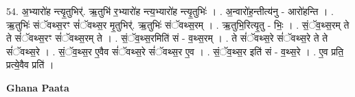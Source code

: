 \documentclass[17pt]{extarticle}
\begin{document}
54. अ॒भ्यारो॑ह न्त्यृ॒तुभिर्॑. ऋ॒तुभि॑ र॒भ्यारो॑ह न्त्य॒भ्यारो॑ह न्त्यृ॒तुभिः॑ । . अ॒न्वारो॑ह॒न्तीत्य॑नु - आरो॑हन्ति । . ऋ॒तुभिः॑ संॅवथ्स॒रꣳ सं॑ॅवथ्स॒र मृ॒तुभिर्॑. ऋ॒तुभिः॑ संॅवथ्स॒रम् । . ऋ॒तुभि॒रित्यृ॒तु - भिः॒ । . सं॒ॅव॒थ्स॒रम् ते ते सं॑ॅवथ्स॒रꣳ सं॑ॅवथ्स॒रम् ते । . सं॒ॅव॒थ्स॒रमिति॑ सं - व॒थ्स॒रम् । . ते सं॑ॅवथ्स॒रे सं॑ॅवथ्स॒रे ते ते सं॑ॅवथ्स॒रे । . सं॒ॅव॒थ्स॒र ए॒वैव सं॑ॅवथ्स॒रे सं॑ॅवथ्स॒र ए॒व । . सं॒ॅव॒थ्स॒र इति॑ सं - व॒थ्स॒रे । . ए॒व प्रति॒ प्रत्ये॒वैव प्रति॑ । \newline

\textbf{Ghana Paata } \newline
\end{document}
